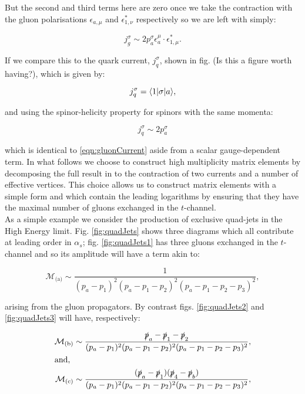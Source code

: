 		But the second and third terms here are zero once we take the contraction with the gluon polarisations $\epsilon_{a, \mu}$
		and $\epsilon_{1, \nu}^*$ respectively so we are left with simply:

		\begin{equation}
			j_{g}^\sigma \sim 2p_a^\sigma\epsilon_{a}^\mu\cdot\epsilon_{1, \mu}^*.
			\label{eqn:gluonCurrent}
		\end{equation}

		If we compare this to the quark current, $j_{q}^\sigma$, shown in fig. (Is this a figure worth having?),
		which is given by:

		\begin{equation}
			j_{q}^\sigma = \langle 1 | \sigma | a \rangle,
		\end{equation}

		and using the spinor-helicity property for spinors with the same momenta:

		\begin{equation}
			j_{q}^\sigma \sim 2p_a^\sigma
		\end{equation}

		which is identical to \eqref{eqn:gluonCurrent} aside from a scalar gauge-dependent term.  In what
		follows we choose to construct high multiplicity matrix elements by decomposing the full result
		in to the contraction of two currents and a number of effective vertices.  This choice allows us
		to construct matrix elements with a simple form and which contain the leading logarithms by
		ensuring that they have the maximal number of gluons exchanged in the $t$-channel.\\
		As a simple example we consider the production of exclusive quad-jets in the High Energy limit.
		Fig. \eqref{fig:quadJets} shows three diagrams which all contribute at leading order in $\alpha_s$;
		fig. \eqref{fig:quadJets1} has three gluons exchanged in the $t$-channel and so its amplitude will
		have a term akin to:

		\begin{equation}
			\mathcal{M}_{\text{(a)}}\sim\frac{1}{(p_a - p_1)^2(p_a - p_1 - p_2)^2(p_a - p_1 - p_2 - p_3)^2},
		\end{equation}

		arising from the gluon propagators.  By contrast figs. \eqref{fig:quadJets2} and \eqref{fig:quadJets3} will
		have, respectively:

		\begin{align}
			\mathcal{M}_{\text{(b)}}\sim\frac{\slashed p_a - \slashed p_1 - \slashed p_2}
			{(p_a - p_1)^2(p_a - p_1 - p_2)^2(p_a - p_1 - p_2 - p_3)^2},\\
			\intertext{and,}
			\mathcal{M}_{\text{(c)}}\sim\frac{(\slashed p_a - \slashed p_1)(\slashed p_4 - \slashed p_b)}
			{(p_a - p_1)^2(p_a - p_1 - p_2)^2(p_a - p_1 - p_2 - p_3)^2},
		\end{align}

